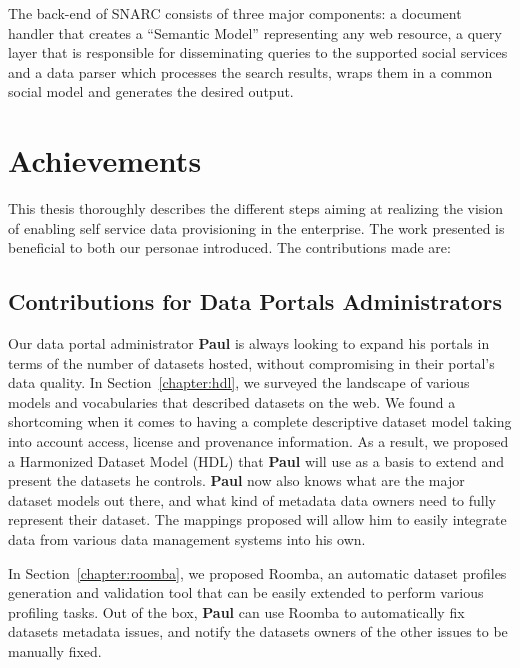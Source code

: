 \documentclass[a4paper,11pt,twoside]{ThesisStyle}
\begin{document}
The back-end of SNARC consists of three major components: a document handler that creates a ``Semantic Model'' representing any web resource, a query layer that is responsible for disseminating queries to the supported social services and a data parser which processes the search results, wraps them in a common social model and generates the desired output.


\chapter{Achievements}

This thesis thoroughly describes the different steps aiming at realizing the vision of enabling self service data provisioning in the enterprise. The work presented is beneficial to both our personae introduced. The contributions made are: \\

\section{Contributions for Data Portals Administrators}

Our data portal administrator \textbf{Paul} is always looking to expand his portals in terms of the number of datasets hosted, without compromising in their portal's data quality. In Section~\ref{chapter:hdl}, we surveyed the landscape of various models and vocabularies that described datasets on the web. We found a shortcoming when it comes to having a complete descriptive dataset model taking into account access, license and provenance information. As a result, we proposed a Harmonized Dataset Model (HDL) that \textbf{Paul} will use as a basis to extend and present the datasets he controls. \textbf{Paul} now also knows what are the major dataset models out there, and what kind of metadata data owners need to fully represent their dataset. The mappings proposed will allow him to easily integrate data from various data management systems into his own.

In Section~\ref{chapter:roomba}, we proposed Roomba, an automatic dataset profiles generation and validation tool that can be easily extended to perform various profiling tasks. Out of the box, \textbf{Paul} can use Roomba to automatically fix datasets metadata issues, and notify the datasets owners of the other issues to be manually fixed.
\end{document}
